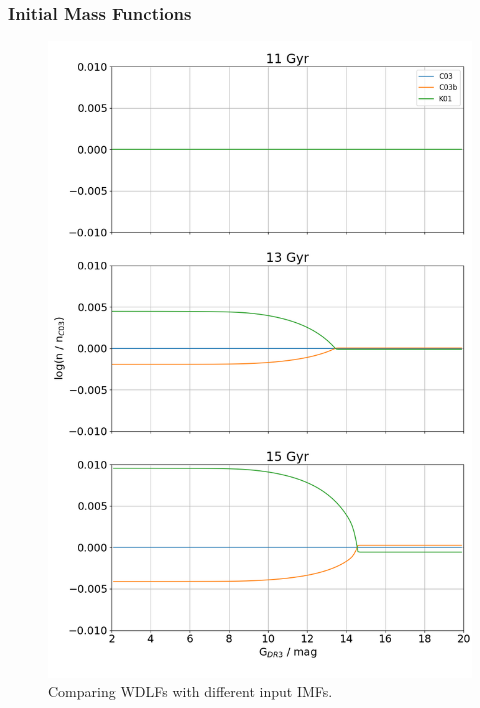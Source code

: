 \documentclass[fleqn,usenatbib]{rasti}
\begin{document}
\subsubsection{Initial Mass Functions}
\begin{figure}
    \centering
    \includegraphics[width=\columnwidth]{wdlf_compare_imf.png}
    \caption{Comparing WDLFs with different input IMFs.}
    \label{fig:wdlf_compare_imf}
\end{figure}
\end{document}
